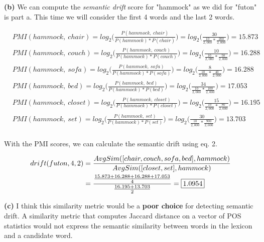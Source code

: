 \documentclass[11pt]{article}
\renewcommand\part[1]{\vspace{.10in}\textbf{(#1)}}
\begin{document}
\part{b} We can compute the \textit{semantic drift} score for "hammock" as we did for "futon" is part a. This time we will consider the first 4 words and the last 2 words.

\begin{align*}
&PMI(hammock, \ chair) = log_2\bigg(\frac{P(hammock, \ chair)}{P(hammock) * P(chair)}\bigg) = log_2\bigg(\frac{30}{\frac{10}{2,000} * \frac{200}{2,000}}\bigg) =  15.873\\
&PMI(hammock, \ couch) = log_2\bigg(\frac{P(hammock, \ couch)}{P(hammock) * P(couch)}\bigg) = log_2\bigg(\frac{10}{\frac{10}{2,000} * \frac{50}{2,000}}\bigg) =  16.288\\
&PMI(hammock, \ sofa) = log_2\bigg(\frac{P(hammock, \ sofa)}{P(hammock) * P(sofa)}\bigg) = log_2\bigg(\frac{8}{\frac{10}{2,000} * \frac{40}{2,000}}\bigg) =  16.288\\
&PMI(hammock, \ bed) = log_2\bigg(\frac{P(hammock, \ bed)}{P(hammock) * P(bed)}\bigg) = log_2\bigg(\frac{34}{\frac{10}{2,000} * \frac{100}{2,000}}\bigg) =  17.053\\
&PMI(hammock, \ closet) = log_2\bigg(\frac{P(hammock, \ closet)}{P(hammock) * P(closet)}\bigg) = log_2\bigg(\frac{15}{\frac{10}{2,000} * \frac{80}{2,000}}\bigg) =  16.195\\
&PMI(hammock, \ set) = log_2\bigg(\frac{P(hammock, \ set)}{P(hammock) * P(set)}\bigg) = log_2\bigg(\frac{30}{\frac{10}{2,000} * \frac{900}{2,000}}\bigg) =  13.703\\
\end{align*}

With the PMI scores, we can calculate the semantic drift using eq. 2.

\begin{align*}
drift(futon, 4, 2) &= \frac{AvgSim([chair, couch, sofa, bed], hammock)}{AvgSim([closet, set], hammock)} \\ &= \frac{\frac{15.873 + 16.288 + 16.288 + 17.053}{4}}{\frac{16.195 + 13.703}{2}} = \framebox[1.2\width]{1.0954}\\
\end{align*}

\part{c} I think this similarity metric would be a \textbf{poor choice} for detecting semantic drift. A similarity metric that computes Jaccard distance on a vector of POS statistics would not express the semantic similarity between words in the lexicon and a candidate word.
\end{document}
